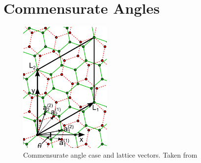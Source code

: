 %

\section{Commensurate Angles}

\begin{figure}[H]
\centering
\includegraphics[width=0.4\textwidth]{fig/latvec.png}
\caption{Commensurate angle case and lattice vectors. Taken from \cite{koshino2012}}
\label{fig:latvec}
\end{figure}

